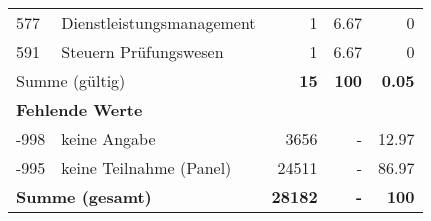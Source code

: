 \begin{longtable}{lXrrr}
     577 &
     \multicolumn{1}{X}{ Dienstleistungsmanagement   } &


       \num{1} &
       \num[round-mode=places,round-precision=2]{6,67} &
         \num[round-mode=places,round-precision=2]{0} \\

     591 &
     \multicolumn{1}{X}{ Steuern Prüfungswesen   } &


       \num{1} &
       \num[round-mode=places,round-precision=2]{6,67} &
         \num[round-mode=places,round-precision=2]{0} \\
     \midrule
     \multicolumn{2}{l}{Summe (gültig)} &
       \textbf{\num{15}} &
     \textbf{100} &
       \textbf{\num[round-mode=places,round-precision=2]{0,05}} \\
     \multicolumn{5}{l}{\textbf{Fehlende Werte}}\\
       -998 &
       keine Angabe &
         \num{3656} &
        - &
         \num[round-mode=places,round-precision=2]{12,97} \\
       -995 &
       keine Teilnahme (Panel) &
         \num{24511} &
        - &
         \num[round-mode=places,round-precision=2]{86,97} \\
     \midrule
     \multicolumn{2}{l}{\textbf{Summe (gesamt)}} &
          \textbf{\num{28182}} &
        \textbf{-} &
        \textbf{100} \\
     \bottomrule
     \end{longtable}
     
